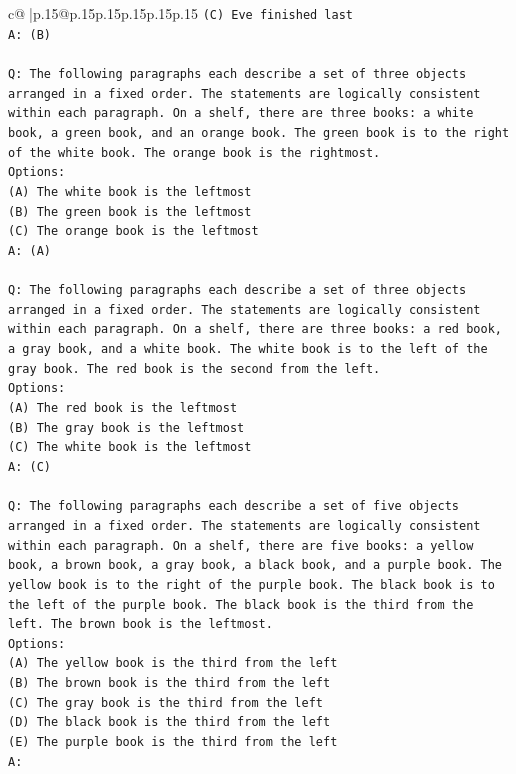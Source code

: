 \documentclass{article}
\begin{document}
{\begin{supertabular}{c@{$\;$}|p{.15\linewidth}@{}p{.15\linewidth}p{.15\linewidth}p{.15\linewidth}p{.15\linewidth}p{.15\linewidth}}
{{{\texttt{(C) Eve finished last} \\
\texttt{A: (B)} \\
\\ 
\texttt{Q: The following paragraphs each describe a set of three objects arranged in a fixed order. The statements are logically consistent within each paragraph. On a shelf, there are three books: a white book, a green book, and an orange book. The green book is to the right of the white book. The orange book is the rightmost.} \\
\texttt{Options:} \\
\texttt{(A) The white book is the leftmost} \\
\texttt{(B) The green book is the leftmost} \\
\texttt{(C) The orange book is the leftmost} \\
\texttt{A: (A)} \\
\\ 
\texttt{Q: The following paragraphs each describe a set of three objects arranged in a fixed order. The statements are logically consistent within each paragraph. On a shelf, there are three books: a red book, a gray book, and a white book. The white book is to the left of the gray book. The red book is the second from the left.} \\
\texttt{Options:} \\
\texttt{(A) The red book is the leftmost} \\
\texttt{(B) The gray book is the leftmost} \\
\texttt{(C) The white book is the leftmost} \\
\texttt{A: (C)} \\
\\ 
\texttt{Q: The following paragraphs each describe a set of five objects arranged in a fixed order. The statements are logically consistent within each paragraph. On a shelf, there are five books: a yellow book, a brown book, a gray book, a black book, and a purple book. The yellow book is to the right of the purple book. The black book is to the left of the purple book. The black book is the third from the left. The brown book is the leftmost.} \\
\texttt{Options:} \\
\texttt{(A) The yellow book is the third from the left} \\
\texttt{(B) The brown book is the third from the left} \\
\texttt{(C) The gray book is the third from the left} \\
\texttt{(D) The black book is the third from the left} \\
\texttt{(E) The purple book is the third from the left} \\
\texttt{A:} \\
            }
        }
    }
     \\ \\


\end{supertabular}}
\end{document}
